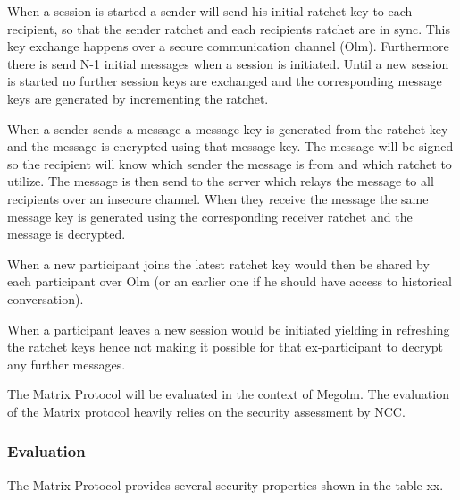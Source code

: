 When a session is started a sender will send his initial ratchet key to each recipient, so that the sender ratchet and each recipients ratchet are in sync. This key exchange happens over a secure communication channel (Olm). Furthermore there is send N-1 initial messages when a session is initiated. Until a new session is started no further session keys are exchanged and the corresponding message keys are generated by incrementing the ratchet.

When a sender sends a message a message key is generated from the ratchet key and the message is encrypted using that message key. The message will be signed so the recipient will know which sender the message is from and which ratchet to utilize. %
The message  is then send to the server which relays the message to all recipients over an insecure channel. When they receive the message the same message key is generated using the corresponding receiver ratchet and the message is decrypted. 

When a new participant joins the latest ratchet key would then be shared by each participant over Olm (or an earlier one if he should have access to historical conversation). 

When a participant leaves a new session would be initiated yielding in refreshing the ratchet keys hence not making it possible for that ex-participant to decrypt any further messages.





The Matrix Protocol will be evaluated in the context of Megolm. The evaluation of the Matrix protocol heavily relies on the security assessment by NCC.


\subsubsection{Evaluation}

The Matrix Protocol provides several security properties shown in the table xx. 

